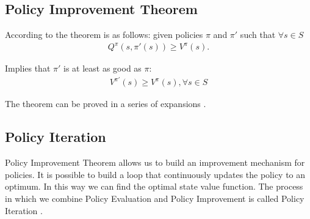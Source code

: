 \subsection{Policy Improvement Theorem}
According to \cite{lecture_dp} the theorem is as follows: given policies $\pi$ and $\pi'$ such that $\forall s \in S$
\begin{align}
    Q^{\pi}(s, \pi'(s)) \geq V^{\pi}(s).
\end{align}

Implies that $\pi'$ is at least as good as $\pi$:
\begin{align}
    V^{\pi'}(s) \geq V^{\pi}(s), \forall s \in S
\end{align}

The theorem can be proved in a series of expansions \cite{lecture_dp}.

\subsection{Policy Iteration}
Policy Improvement Theorem allows us to build an improvement mechanism for policies. It is possible to build a loop that
continuously updates the policy to an optimum. In this way we can find the optimal state value function. The process in which we combine Policy Evaluation and Policy Improvement is called Policy Iteration \cite{lecture_dp}.


 

